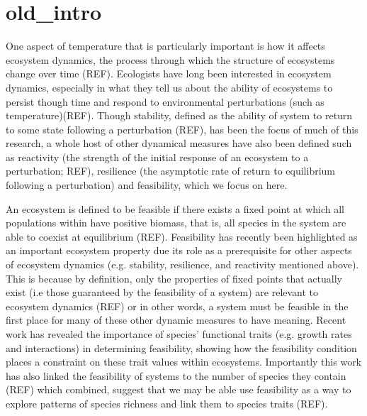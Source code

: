 \documentclass{article}
\begin{document}
\section{old_intro}
One aspect of temperature that is particularly important is how it affects ecosystem dynamics, the process through which the structure of ecosystems change over time (REF). Ecologists have long been interested in ecosystem dynamics, especially in what they tell us about the ability of ecosystems to persist though time and respond to environmental perturbations (such as temperature)(REF). Though stability, defined as the ability of system to return to some state following a perturbation (REF), has been the focus of much of this research, a whole host of other dynamical measures have also been defined such as reactivity (the strength of the initial response of an ecosystem to a perturbation; REF), resilience (the asymptotic rate of return to equilibrium following a perturbation) and feasibility, which we focus on here. 

An ecosystem is defined to be feasible if there exists a fixed point at which all populations within have positive biomass, that is, all species in the system are able to coexist at equilibrium (REF). Feasibility has recently been highlighted as an important ecosystem property due its role as a prerequisite for other aspects of ecosystem dynamics (e.g. stability, resilience, and reactivity mentioned above). This is because by definition, only the properties of fixed points that actually exist (i.e those guaranteed by the feasibility of a system) are relevant to ecosystem dynamics (REF) or in other words, a system must be feasible in the first place for many of these other dynamic measures to have meaning. Recent work has revealed the importance of species' functional traits (e.g. growth rates and interactions) in determining feasibility, showing how the feasibility condition places a constraint on these trait values within ecosystems. Importantly this work has also linked the feasibility of systems to the number of species they contain (REF) which combined, suggest that we may be able use feasibility as a way to explore patterns of species richness and link them to species traits (REF). 
\end{document}
